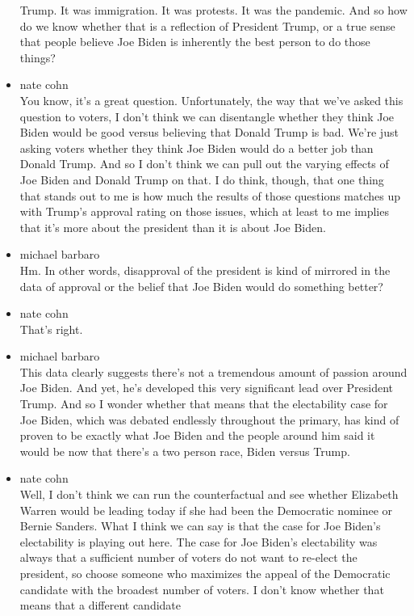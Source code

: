 \begin{itemize}
  Trump. It was immigration. It was protests. It was the pandemic. And
  so how do we know whether that is a reflection of President Trump, or
  a true sense that people believe Joe Biden is inherently the best
  person to do those things?
\item
  nate cohn\\
  You know, it's a great question. Unfortunately, the way that we've
  asked this question to voters, I don't think we can disentangle
  whether they think Joe Biden would be good versus believing that
  Donald Trump is bad. We're just asking voters whether they think Joe
  Biden would do a better job than Donald Trump. And so I don't think we
  can pull out the varying effects of Joe Biden and Donald Trump on
  that. I do think, though, that one thing that stands out to me is how
  much the results of those questions matches up with Trump's approval
  rating on those issues, which at least to me implies that it's more
  about the president than it is about Joe Biden.
\item
  michael barbaro\\
  Hm. In other words, disapproval of the president is kind of mirrored
  in the data of approval or the belief that Joe Biden would do
  something better?
\item
  nate cohn\\
  That's right.
\item
  michael barbaro\\
  This data clearly suggests there's not a tremendous amount of passion
  around Joe Biden. And yet, he's developed this very significant lead
  over President Trump. And so I wonder whether that means that the
  electability case for Joe Biden, which was debated endlessly
  throughout the primary, has kind of proven to be exactly what Joe
  Biden and the people around him said it would be now that there's a
  two person race, Biden versus Trump.
\item
  nate cohn\\
  Well, I don't think we can run the counterfactual and see whether
  Elizabeth Warren would be leading today if she had been the Democratic
  nominee or Bernie Sanders. What I think we can say is that the case
  for Joe Biden's electability is playing out here. The case for Joe
  Biden's electability was always that a sufficient number of voters do
  not want to re-elect the president, so choose someone who maximizes
  the appeal of the Democratic candidate with the broadest number of
  voters. I don't know whether that means that a different candidate

\end{itemize}
